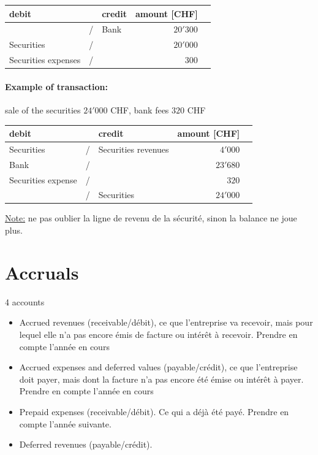 \documentclass[a4paper] {scrartcl}
\begin{document}
\begin{tabular}{lllrl}
	\textbf{debit} & & \textbf{credit} & \textbf{amount} [CHF]&\\
	\hline
	 & / & Bank & $20'300$&\\
	 Securities & / &  & $20'000$&\\
	 Securities expenses & / &   & $300$&\\
\end{tabular}


\paragraph{Example of transaction:}


sale of the securities $24'000$ CHF, bank fees $320$ CHF\\

\begin{tabular}{lllrl}
	\textbf{debit} & & \textbf{credit} & \textbf{amount} [CHF]&\\
	\hline
	Securities & / & Securities revenues & $4'000$&\\
	 Bank & / &  & $23'680$&\\
	 Securities expense & / &  & $320$&\\
	  & / & Securities & $24'000$&\\
\end{tabular}

\underline{Note:} ne pas oublier la ligne de revenu de la sécurité, sinon la balance ne joue plus.

\section{Accruals}
4 accounts
\begin{itemize}
	\item Accrued revenues (receivable/débit), ce que l'entreprise va recevoir, mais pour lequel elle n'a pas encore émis de facture ou intérêt à recevoir. Prendre en compte l'année en cours
	\item Accrued expenses and deferred values (payable/crédit), ce que l'entreprise doit payer, mais dont la facture n'a pas encore été émise ou intérêt à payer. Prendre en compte l'année en cours
	\item Prepaid expenses (receivable/débit). Ce qui a déjà été payé. Prendre en compte l'année suivante.
	\item Deferred revenues (payable/crédit). 
\end{itemize}
\end{document}
